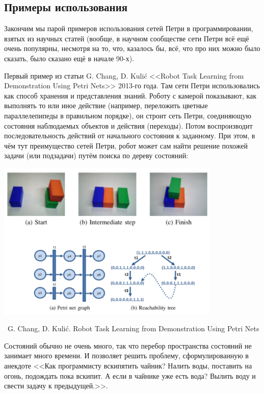 \documentclass[a5paper]{article}
\newcommand{\attribution}[1] {
    \vspace{-5mm}\begin{flushright}\begin{scriptsize}%
    {\textcopyright\, #1}\end{scriptsize}\end{flushright}
}
\begin{document}
\subsection{Примеры использования}

Закончим мы парой примеров использования сетей Петри в программировании, взятых из научных статей (вообще, в научном сообществе сети Петри всё ещё очень популярны, несмотря на то, что, казалось бы, всё, что про них можно было сказать, было сказано ещё в начале 90-х). 

Первый пример из статьи G. Chang, D. Kulić <<Robot Task Learning from Demonstration Using Petri Nets>> 2013-го года. Там сети Петри использовались как способ хранения и представления знаний. Роботу с камерой показывают, как выполнять то или иное действие (например, переложить цветные параллелепипеды в правильном порядке), он строит сеть Петри, соединяющую состояния наблюдаемых объектов и действия (переходы). Потом воспроизводит последовательность действий от начального состояния к заданному. При этом, в чём тут преимущество сетей Петри, робот может сам найти решение похожей задачи (или подзадачи) путём поиска по дереву состояний:

\begin{center}
    \includegraphics[width=0.8\textwidth]{petriUsageExample1.png}
    \attribution{G. Chang, D. Kulić. Robot Task Learning from Demonstration Using Petri Nets}
\end{center}

Состояний обычно не очень много, так что перебор пространства состояний не занимает много времени. И позволяет решить проблему, сформулированную в анекдоте <<Как программисту вскипятить чайник? Налить воды, поставить на огонь, подождать пока вскипит. А если в чайнике уже есть вода? Вылить воду и свести задачу к предыдущей.>>.
\end{document}
